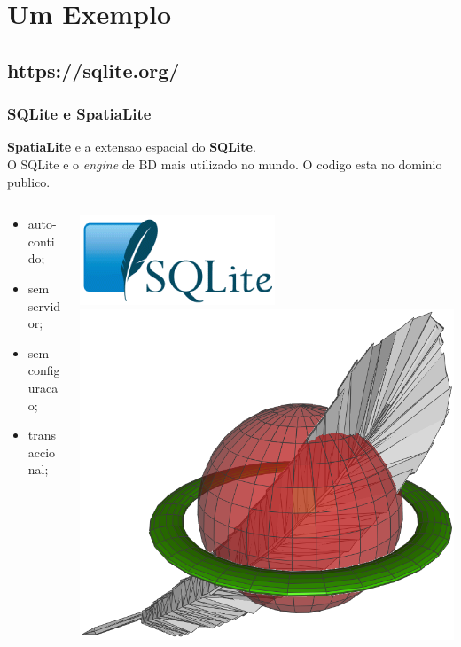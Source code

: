 \documentclass[hyperref={pdfpagelabels=true}]{beamer}
\begin{document}
\section{Um Exemplo}
\subsection{https://sqlite.org/}
\begin{frame}
\frametitle{SQLite e SpatiaLite}
\textbf{SpatiaLite} e a extensao espacial do \textbf{SQLite}.\\
O SQLite e o \textit{engine} de BD mais utilizado no mundo. O codigo esta no dominio publico.\\
\begin{columns}
  \begin{column}{7cm}
    \begin{itemize}
      \item<2-> auto-contido;
      \item<3-> sem servidor;
      \item<4-> sem configuracao;
      \item<5-> transaccional;      
    \end{itemize}    
  \end{column}
  \begin{column}{10cm}
    \includegraphics[scale=0.3]{sqlite.png}
    \includegraphics[scale=0.1]{spatialite.png}       
  \end{column}  
\end{columns} 
\end{frame}
\end{document}
